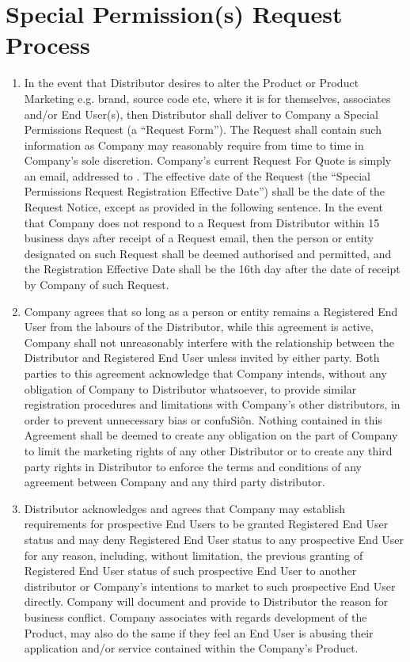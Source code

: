 \documentclass[letterpaper,10pt,english]{sphinxmanual}
\begin{document}
\section{Special Permission(s) Request Process}
\label{\detokenize{grantlicence:special-permission-s-request-process}}\begin{enumerate}
\item {} 
In the event that Distributor desires to alter the Product or Product Marketing e.g. brand, source code etc, where it is for themselves, associates and/or End User(s), then Distributor shall deliver to Company a Special Permissions Request (a “Request Form”). The Request shall contain such information as Company may reasonably require from time to time in Company’s sole discretion. Company’s current Request For Quote is simply an email, addressed to  .  The effective date of the Request  (the “Special Permissions Request Registration Effective Date”) shall be the date of the Request Notice, except as provided in the following sentence. In the event that Company does not respond to a Request from Distributor within 15 business days after receipt of a Request email, then the person or entity designated on such Request shall be deemed authorised and permitted, and the Registration Effective Date  shall be the 16th day after the date of receipt by Company of such Request.

\item {} 
Company agrees that so long as a person or entity remains a Registered End User from the  labours of the Distributor, while this agreement is active, Company shall not unreasonably interfere with the relationship between the Distributor and Registered End User unless invited by either party. Both parties to this agreement acknowledge that Company intends, without any obligation of Company to Distributor whatsoever, to provide similar registration procedures and limitations with Company’s other distributors, in order to prevent unnecessary bias or confuSiôn. Nothing contained in this Agreement shall be deemed to create any obligation on the part of Company to limit the marketing rights of any other Distributor or to create any third party rights in Distributor to enforce the terms and conditions of any agreement between Company and any third party distributor.

\item {} 
Distributor acknowledges and agrees that Company may establish requirements for prospective End Users to be granted Registered End User status and may deny Registered End User status to any prospective End User for any reason, including, without limitation, the previous granting of Registered End User status of such prospective End User to another distributor or Company’s intentions to market to such prospective End User directly. Company will document and provide to Distributor the reason for business conflict. Company associates with regards development of the Product, may also do the same if they feel an End User is abusing their application and/or service contained within the Company’s Product.

\end{enumerate}
\end{document}
